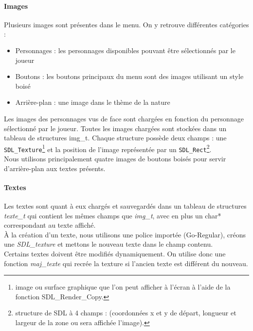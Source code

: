 \documentclass[11pt]{article}
\begin{document}
                \paragraph{Images}\leavevmode\newline
                Plusieurs images sont présentes dans le menu. On y retrouve différentes catégories : 
                \begin{itemize}
                    \item Personnages : les personnages disponibles pouvant être sélectionnés par le joueur
                    \item Boutons : les boutons principaux du menu sont des images utilisant un style boisé
                    \item Arrière-plan : une image dans le thème de la nature 
                \end{itemize}
                \leavevmode\newline
                Les images des personnages vus de face sont chargées en fonction du personnage sélectionné par le joueur. 
                Toutes les images chargées sont stockées dans un tableau de structures img\_t. Chaque structure possède deux champs : une \texttt{SDL\_Texture}\footnote{image ou surface graphique que l’on peut afficher à l’écran à l’aide de la fonction SDL\_Render\_Copy.} et la position de l’image représentée par un \texttt{SDL\_Rect}\footnote{structure de SDL à 4 champs : (coordonnées x et y de départ, longueur et largeur de la zone ou sera affichée l’image).}.\\
                Nous utilisons principalement quatre images de boutons boisés pour servir d’arrière-plan aux textes présents.

                \paragraph{Textes}\leavevmode\newline
                Les textes sont quant à eux chargés et sauvegardés dans un tableau de structures \textit{texte\_t} qui contient les mêmes champs que \textit{img\_t}, avec en plus un char* correspondant au texte affiché.\\
                À la création d’un texte, nous utilisons une police importée (Go-Regular), créons une \textit{SDL\_texture} et mettons le nouveau texte dans le  champ contenu.\\
                Certains textes doivent être modifiés dynamiquement. On utilise donc une fonction \textit{maj\_texte} qui recrée la texture si l’ancien texte est différent du nouveau.
                
\end{document}
